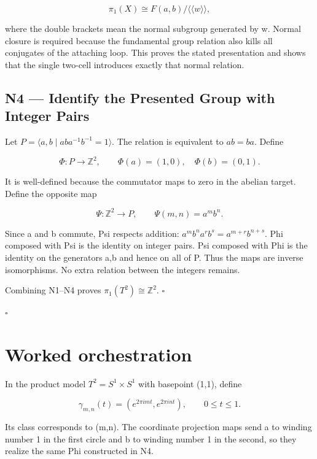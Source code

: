\documentclass[preprint,12pt,aps,pra,showkeys,amsmath,amssymb,superscriptaddress,floatfix]{revtex4-2}
\theoremstyle{definition}
\theoremstyle{remark}
\begin{document}
\[\pi_1(X)\cong F(a,b)/\langle\!\langle w\rangle\!\rangle,\]

where the double brackets mean the normal subgroup generated by w.
Normal closure is required because the fundamental group relation also
kills all conjugates of the attaching loop. This proves the stated
presentation and shows that the single two-cell introduces exactly that
normal relation.

\subsection{N4 --- Identify the Presented Group with Integer
Pairs}\label{n4-identify-the-presented-group-with-integer-pairs}

Let \(P=\langle a,b\mid aba^{-1}b^{-1}=1\rangle\). The relation is
equivalent to \(ab=ba\). Define

\[\Phi:P\to\mathbb Z^2,\qquad\Phi(a)=(1,0),\quad\Phi(b)=(0,1).\]

It is well-defined because the commutator maps to zero in the abelian
target. Define the opposite map

\[\Psi:\mathbb Z^2\to P,\qquad\Psi(m,n)=a^mb^n.\]

Since a and b commute, Psi respects addition:
\(a^mb^na^rb^s=a^{m+r}b^{n+s}\). Phi composed with Psi is the identity
on integer pairs. Psi composed with Phi is the identity on the
generators a,b and hence on all of P. Thus the maps are inverse
isomorphisms. No extra relation between the integers remains.

Combining N1--N4 proves \(\pi_1(T^2)\cong\mathbb Z^2\). \(\square\)

\hfill$\square$

\section{Worked orchestration}

In the product model \(T^2=S^1\times S^1\) with basepoint (1,1), define

\[\gamma_{m,n}(t)=(e^{2\pi imt},e^{2\pi int}),\qquad0\le t\le1.\]

Its class corresponds to (m,n). The coordinate projection maps send a to
winding number 1 in the first circle and b to winding number 1 in the
second, so they realize the same Phi constructed in N4.
\end{document}
